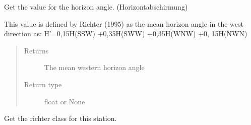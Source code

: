 \documentclass[letterpaper,10pt,english]{sphinxmanual}
\begin{document}
\begin{fulllineitems}

\begin{fulllineitems}
\label{\detokenize{weatherDB:weatherDB.station.PrecipitationStation.get_horizon}}
\sphinxAtStartPar
Get the value for the horizon angle. (Horizontabschirmung)

\sphinxAtStartPar
This value is defined by Richter (1995) as the mean horizon angle in the west direction as:
H’=0,15H(S\sphinxhyphen{}SW) +0,35H(SW\sphinxhyphen{}W) +0,35H(W\sphinxhyphen{}NW) +0, 15H(NW\sphinxhyphen{}N)
\begin{quote}\begin{description}
\item[{Returns}] \leavevmode
\sphinxAtStartPar
The mean western horizon angle

\item[{Return type}] \leavevmode
\sphinxAtStartPar
float or None

\end{description}\end{quote}

\end{fulllineitems}


\begin{fulllineitems}
\label{\detokenize{weatherDB:weatherDB.station.PrecipitationStation.get_qn}}
\end{fulllineitems}


\begin{fulllineitems}
\label{\detokenize{weatherDB:weatherDB.station.PrecipitationStation.get_richter_class}}
\sphinxAtStartPar
Get the richter class for this station.


\end{fulllineitems}
\end{fulllineitems}
\end{document}
